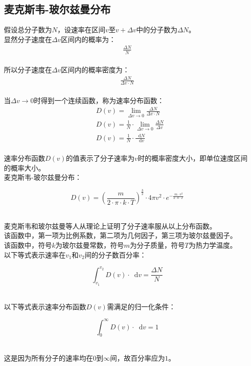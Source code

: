 \documentclass[UTF8]{ctexart}
\newcommand*{\dif}{\mathop{}\!\mathrm{d}}
\begin{document}
\subsection{麦克斯韦-玻尔兹曼分布}
    \setcounter{equation}{0}
    假设总分子数为$N$，设速率在区间$v$至$v+\Delta v$中的分子数为$\Delta N$。\\[3mm]
    显然分子速度在$\Delta v$区间内的概率为：
    \begin{align}
        \frac{\Delta N}{N}
    \end{align}\\
    所以分子速度在$\Delta v$区间内的概率密度为：
    \begin{align}
        \frac{\Delta N}{\Delta v\cdot N}
    \end{align}\\
    当$\Delta v\rightarrow 0$时得到一个连续函数，称为速率分布函数：\vspace{5pt}
    \begin{align}
        &D(v)=\lim_{\Delta v\rightarrow 0}\frac{\Delta N}{\Delta v\cdot N}\\[2mm]
        &D(v)=\frac{1}{N}\cdot\lim_{\Delta v\rightarrow 0}\frac{\Delta N}{\Delta v}\\[2mm]
        &D(v)=\frac{1}{N}\cdot\frac{\dif N}{\dif v}
    \end{align}\\
    速率分布函数$D(v)$的值表示了分子速率为$v$时的概率密度大小，即单位速度区间的概率大小。\\[6mm]
    麦克斯韦-玻尔兹曼分布：
    \begin{large}
        \begin{equation*}
            D(v)=\left(\frac{m}{2\cdot\pi\cdot k\cdot T}\right)^{\frac{3}{2}}\cdot 4\pi v^2\cdot e^{-\frac{~m\cdot v^2}{2\cdot k\cdot T}}
        \end{equation*}
    \end{large}\\
    麦克斯韦和玻尔兹曼等人从理论上证明了分子速率服从以上分布函数。\\[3mm]
    该函数中，第一项为比例系数，第二项为几何因子，第三项为玻尔兹曼因子。\\[3mm]
    该函数中，符号$k$为玻尔兹曼常数，符号$m$为分子质量，符号$T$为热力学温度。\\[3mm]
    以下等式表示速率在$v_1$和$v_2$间的分子数百分率：\vspace{5pt}
    \begin{large}
        \begin{equation*}
            \int_{v_1}^{v_2}D(v)\cdot\dif v=\frac{\Delta N}{N}
        \end{equation*}
    \end{large}\\
    以下等式表示速率分布函数$D(v)$需满足的归一化条件：\vspace{5pt}
    \begin{large}
        \begin{equation*}
            \int_{0}^{\infty}D(v)\cdot\dif v=1
        \end{equation*}
    \end{large}\\
    这是因为所有分子的速率均在$0$到$\infty$间，故百分率应为$1$。
\end{document}
